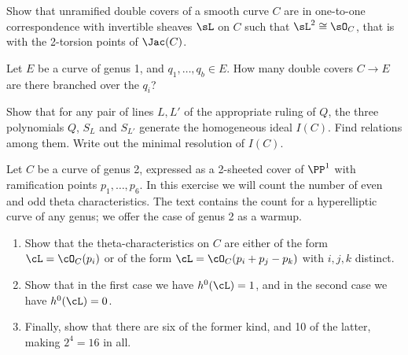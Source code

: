 \begin{exercise}
Show that unramified double covers of a smooth curve $C$ are in one-to-one correspondence
with invertible sheaves $\sL$ on $C$ such that $\sL^2 \cong \sO_C$, that is with the 2-torsion points
of $\Jac(C)$.

\end{exercise}


\begin{exercise} Let $E$ be a curve of genus 1, and $q_1,\dots,q_b \in E$. How many double covers $C \to E$ are there branched over the $q_i$?

\end{exercise}



\begin{exercise}\label{ideal of genus 2 degree 5} 
Show that for any pair of lines $L, L'$ of the appropriate ruling of $Q$, the three polynomials $Q$, $S_L$ and $S_{L'}$ generate the homogeneous ideal $I(C)$. Find relations among them. Write out the minimal resolution of $I(C)$.
\end{exercise}


\begin{exercise}\label{theta char on genus 2} %
 Let $C$ be a curve of genus 2, expressed as a 2-sheeted cover of $\PP^1$ with ramification points $p_1,\dots,p_6$. In this exercise we will
 count the number of
 even and odd theta characteristics.
The text contains the count for a hyperelliptic curve of any genus; we offer 
the case of genus 2 as a warmup.
 \begin{enumerate}
 \item Show that the theta-characteristics on $C$ are either of the form $\cL = \cO_C(p_i)$ or of the form $\cL = \cO_C(p_i + p_j - p_k)$ with $i, j, k$ distinct. 
 \item Show that in the first case we have $h^0(\cL) = 1$, and in the second case we have $h^0(\cL) = 0$. 
 \item Finally, show that there are six of the former kind, and 10 of the latter, making $2^4 = 16$ in all.
 \end{enumerate} 
 \end{exercise}
 
